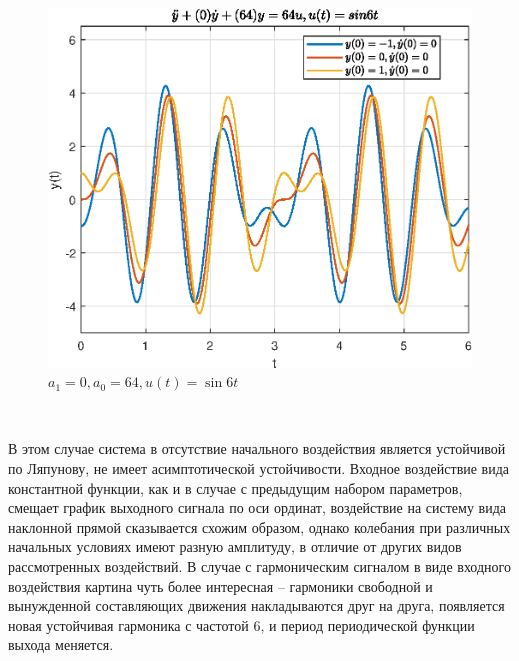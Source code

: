 \documentclass[a4paper]{article}
\begin{document}
\begin{figure}[H]
    \centering
    \includegraphics[width=0.6\linewidth]{ex1/sin6t_0_64.eps}
    \caption{$a_1 = 0, a_0 = 64, u(t) = \sin{6t}$}
\end{figure}\

В этом случае система в отсутствие начального воздействия является устойчивой по Ляпунову, не имеет асимптотической устойчивости. Входное воздействие вида константной функции, как и в случае с предыдущим набором параметров, смещает график выходного сигнала по оси ординат, воздействие на систему вида наклонной прямой сказывается схожим образом, однако колебания при различных начальных условиях имеют разную амплитуду, в отличие от других видов рассмотренных воздействий. В случае с гармоническим сигналом в виде входного воздействия картина чуть более интересная -- гармоники свободной и вынужденной составляющих движения накладываются друг на друга, появляется новая устойчивая гармоника с частотой 6, и период периодической функции выхода меняется.
\end{document}
